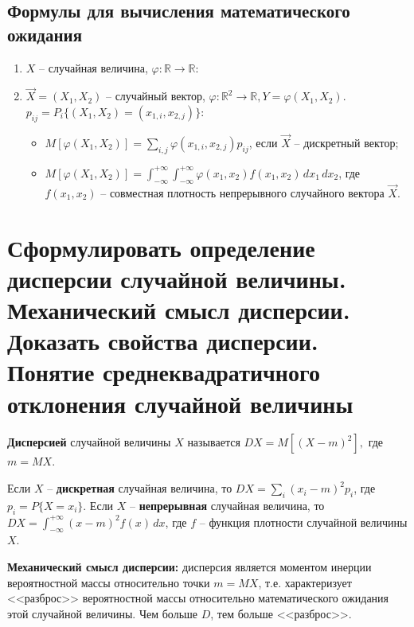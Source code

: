 \subsection*{Формулы для вычисления математического ожидания}

\begin{enumerate}
	\item $X$ -- случайная величина, $\varphi: \mathbb{R} \rightarrow \mathbb{R}$:
	\begin{itemize}
		\item $M[\varphi(X)] = \sum_{i} \varphi(x_i)p_i$, если $X$ -- дискретная случайная величина;
		\item}$M[\varphi(X)] = \int_{-\infty}^{+\infty} \varphi(x)f(x) \, dx$, если $X$ -- непрерывная случайная величина, $f(x)$ -- плотность;
\end{itemize}
\item $\vec{X} = (X_1, X_2)$ -- случайный вектор, $\varphi: \mathbb{R}^2 \rightarrow \mathbb{R}, Y = \varphi(X_1, X_2)$. $p_{ij} = P_i\{(X_1, X_2) = (x_{1, i}, x_{2, j})\}$:
\begin{itemize}
	\item $M[\varphi(X_1, X_2)] = \sum_{i, j} \varphi (x_{1, i}, x_{2, j})p_{ij}$, если $\vec{X}$ -- дискретный вектор;
	\item $M[\varphi(X_1, X_2)] = \int_{-\infty}^{+\infty} \int_{-\infty}^{+\infty} \varphi(x_1, x_2)f(x_1, x_2) \, dx_1 \, dx_2$, где $f(x_1, x_2)$ -- совместная плотность непрерывного случайного вектора $\vec{X}$.
\end{itemize}
\end{enumerate}


\section{Сформулировать определение дисперсии случайной величины. Механический смысл дисперсии. Доказать свойства дисперсии. Понятие среднеквадратичного отклонения случайной величины}

\textbf{Дисперсией} случайной величины $X$ называется $DX = M[(X-m)^2],$ где $m=MX$.

Если $X$ -- \textbf{дискретная} случайная величина, то $DX = \sum_{i} (x_i - m)^2 p_i$, где $p_i = P\{X=x_i\}$. Если  $X$ -- \textbf{непрерывная} случайная величина, то $DX = \int_{-\infty}^{+\infty} (x-m)^2f(x) \, dx$, где $f$ -- функция плотности случайной величины $X$.

\textbf{Механический смысл дисперсии:} дисперсия является моментом инерции вероятностной массы относительно точки $m=MX$, т.е. характеризует <<разброс>> вероятностной массы относительно математического ожидания этой случайной величины. Чем больше $D$, тем больше <<разброс>>.

